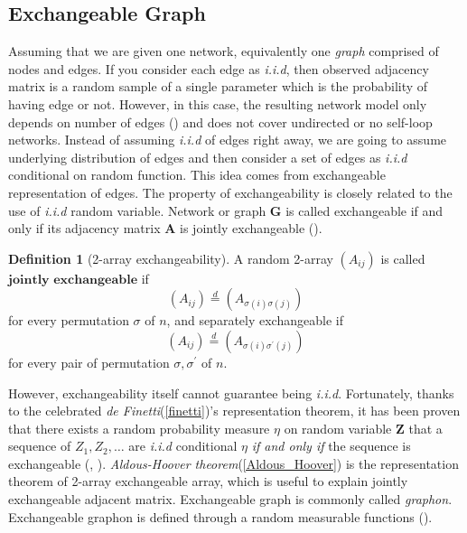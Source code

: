 \documentclass[12pt]{article}
\theoremstyle{definition}
\newtheorem{definition}{Definition}[section]
\begin{document}
	\subsection{Exchangeable Graph}
	
	Assuming that we are given one network, equivalently one \textit{graph} comprised of nodes and edges. If you consider each edge as \textit{i.i.d}, then observed adjacency matrix is a random sample of a single parameter which is the probability of having edge or not. However, in this case, the resulting network model only depends on number of edges (\cite{orbanz2015bayesian}) and does not cover undirected or no self-loop networks. Instead of assuming \textit{i.i.d} of edges right away, we are going to assume underlying distribution of edges and then consider a set of edges as \textit{i.i.d} conditional on random function. This idea comes from exchangeable representation of edges.
	The property of exchangeability is closely related to the use of \textit{i.i.d} random variable. Network or graph $\mathbf{G}$ is called exchangeable if and only if its adjacency matrix $\mathbf{A}$ is jointly exchangeable (\cite{orbanz2015bayesian}). 
	
	\begin{definition}[2-array exchangeability]
		\label{exchangeability}
		A random 2-array $(A_{ij})$ is called $\mathbf{\mbox{jointly exchangeable}}$ if 
		$$(A_{ij}) \stackrel{d}{=} (A_{\sigma(i) \sigma(j)})$$
		for every permutation $\sigma$ of $n$,
		and separately exchangeable if 
		$$(A_{ij}) \stackrel{d}{=} (A_{\sigma(i) \sigma^{\prime}(j) })$$
		for every pair of permutation $\sigma, \sigma^{\prime}$ of $n$.
	\end{definition}
	
	However, exchangeability itself cannot guarantee being \textit{i.i.d}. Fortunately, thanks to the celebrated  \textit{de Finetti}(\ref{finetti})'s representation theorem, it has been proven that there exists a random probability measure $\eta$ on random variable $\mathbf{Z}$ that a sequence of $Z_{1}, Z_{2}, \ldots $ are \textit{i.i.d} conditional $\eta$ \textit{if and only if} the sequence is exchangeable (\cite{orbanz2015bayesian}, \cite{caron2014sparse}). \textit{Aldous-Hoover theorem}(\ref{Aldous_Hoover}) is the representation theorem of 2-array exchangeable array, which is useful to explain jointly exchangeable adjacent matrix. Exchangeable graph is commonly called \textit{graphon}. Exchangeable graphon is defined through a random measurable functions (\cite{chan2013estimation}).
	
\end{document}
